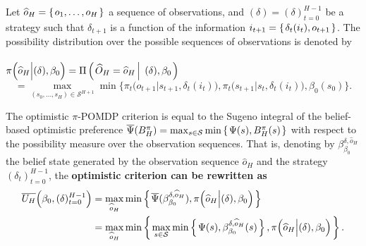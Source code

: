 \begin{theorem}
\label{piPOMDPrewriting}
Let $\widehat{o}_H = \left\{ \left. o_1,\ldots,o_H \right. \right\}$ a sequence of observations,
and $(\delta) = (\delta)_{t=0}^{H-1}$ be a strategy 
such that $\delta_{t+1}$ is a function of the information $i_{t+1}=\left\{ \left.  \delta_t(i_t), o_{t+1}  \right. \right\}$.
The possibility distribution over the possible sequences of observations is denoted by\\
\\ 
$\pi \Big( \widehat{o}_H \Big\vert (\delta), \beta_0 \Big) = \Pi \left( \left.  \widehat{O}_{H} = \widehat{o}_H \, \right| \left. \, (\delta), \beta_0  \right. \right)$
 \[ = \max_{(s_0,\ldots,s_H) \in \mathcal{S}^{H+1}} \min \bigg\{ \pi_t \Big( o_{t+1} \Big\vert s_{t+1}, \delta_t(i_t) \Big), \pi_t \Big( s_{t+1} \Big\vert s_t, \delta_t(i_t) \Big), \beta_0(s_0) \bigg\}. \]

The optimistic $\pi$-POMDP criterion is equal to the Sugeno integral 
of the belief-based optimistic preference $\overline{\Psi}(B_H^{\pi}) = \max_{s \in \mathcal{S}} \min \left\{ \left.  \Psi(s), B^{\pi}_H(s)  \right. \right\}$ 
with respect to the possibility measure over the observation sequences.
That is, denoting by $\beta^{\delta,\widehat{o}_H}_{\beta_0}$
the belief state generated by the observation sequence $\widehat{o}_H$ and the strategy $(\delta_t)_{t=0}^{H-1}$,
the \textbf{optimistic criterion can be rewritten as}
\begin{align}
\label{piPOMDPoptrewriting}
\overline{U_H}\Big(\beta_0,(\delta)_{t=0}^{H-1}\Big) &= \max_{\widehat{o}_H} \min \left\{ \left.  \overline{\Psi}(\beta^{\delta,\widehat{o}_H}_{\beta_0}),  \pi \Big( \widehat{o}_H \Big\vert (\delta), \beta_0 \Big)  \right. \right\} \\
\nonumber &= \max_{\widehat{o}_H} \min \left\{ \left.   \max_{s \in \mathcal{S}} \min \left\{ \left.  \Psi(s),\beta^{\delta,\widehat{o}_H}_{\beta_0}(s)  \right. \right\},  \pi \Big( \widehat{o}_H \Big\vert (\delta), \beta_0 \Big)  \right. \right\}.
\end{align}


\end{theorem}
